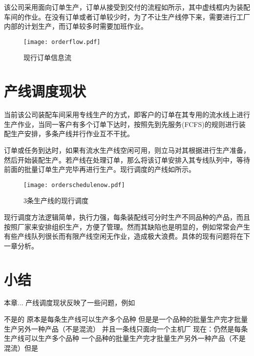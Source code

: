 该公司采用面向订单生产，订单从接受到交付的流程如所示，其中虚线框内为装配车间的作业。在没有订单或者订单较少时，为了不让生产线停下来，需要进行工厂内部的计划生产，而订单较多时需要加班作业。
\begin{figure}[h]
\centering
\texttt{[image: orderflow.pdf]}
\caption{现行订单信息流\label{fig:orderflow}}
\end{figure}

\section{产线调度现状}
当前该公司装配车间采用专线生产的方式，即客户的订单在其专用的流水线上进行生产作业，当同一客户有多个订单下达时，按照先到先服务(FCFS)的规则进行装配生产安排，多条产线并行作业互不干扰。

订单或任务到达时，如果有流水生产线空闲可用，则立马对其根据进行生产准备，然后开始装配生产。若产线在处理订单，那么将该订单安排入其专线队列中，等待前面的批量订单生产完毕再进行生产。现行调度的产线如所示。

\begin{figure}[h]
\caption{3条生产线的现行调度\label{fig:3nowschedule}}\texttt{[image: orderschedulenow.pdf]}
\end{figure}

现行调度方法逻辑简单，执行力强，每条装配线可分时生产不同品种的产品，而且按照厂家来安排组织生产，方便了管理。然而其缺陷也是明显的，例如常常会产生有些产线队列很长而有限产线空闲无作业，造成极大浪费。具体的现有问题将在下一章分析。
\section{小结}
本章...
产线调度现状反映了一些问题，例如


不是的 原本是每条生产线可以生产多个品种 但是是一个品种的批量生产完才批量生产另外一种产品（不是混流） 并且一条线只面向一个主机厂 
现在：仍然是每条生产线可以生产多个品种 一个品种的批量生产完才批量生产另外一种产品（不是混流）但是